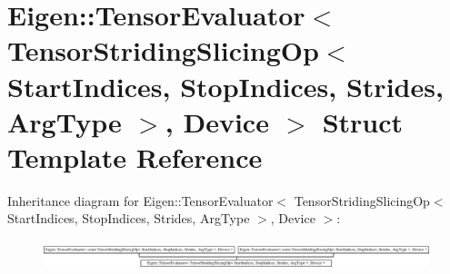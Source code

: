 \hypertarget{struct_eigen_1_1_tensor_evaluator_3_01_tensor_striding_slicing_op_3_01_start_indices_00_01_stop_b19fd6c14958f7e749ce3c389a8eda72}{}\section{Eigen\+:\+:Tensor\+Evaluator$<$ Tensor\+Striding\+Slicing\+Op$<$ Start\+Indices, Stop\+Indices, Strides, Arg\+Type $>$, Device $>$ Struct Template Reference}
\label{struct_eigen_1_1_tensor_evaluator_3_01_tensor_striding_slicing_op_3_01_start_indices_00_01_stop_b19fd6c14958f7e749ce3c389a8eda72}
Inheritance diagram for Eigen\+:\+:Tensor\+Evaluator$<$ Tensor\+Striding\+Slicing\+Op$<$ Start\+Indices, Stop\+Indices, Strides, Arg\+Type $>$, Device $>$\+:\begin{figure}[H]
\begin{center}
\leavevmode
\includegraphics[height=0.840841cm]{struct_eigen_1_1_tensor_evaluator_3_01_tensor_striding_slicing_op_3_01_start_indices_00_01_stop_b19fd6c14958f7e749ce3c389a8eda72}
\end{center}
\end{figure}

